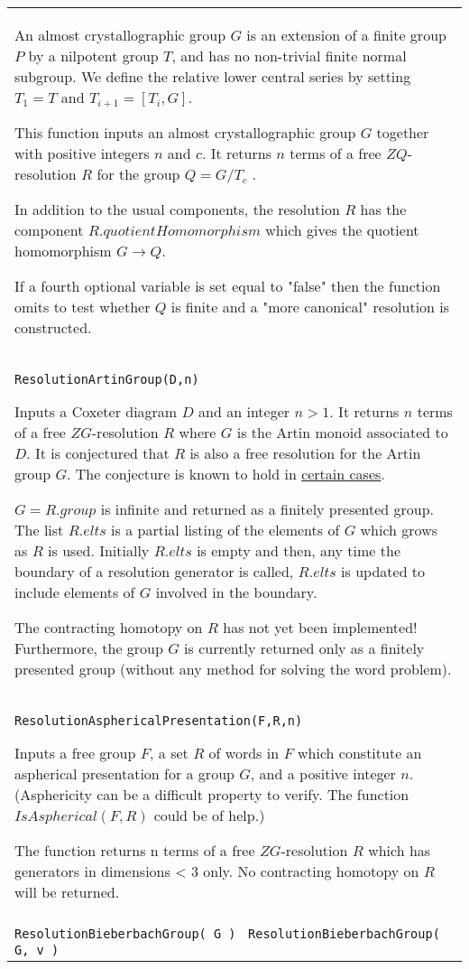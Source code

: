\documentclass[a4paper,11pt]{report}
\begin{document}
{\begin{center}
\begin{tabular}{|l|}
 An almost crystallographic group $G$ is an extension of a finite group $P$ by a nilpotent group $T$, and has no non-trivial finite normal subgroup. We define the relative lower
central series by setting $T_1=T$ and $T_{i+1}=[T_i,G]$.

 This function inputs an almost crystallographic group $G$ together with positive integers $n$ and $c$. It returns $n$ terms of a free $ZQ$-resolution $R$ for the group $Q=G/T_c$ .

 In addition to the usual components, the resolution $R$ has the component $R.quotientHomomorphism$ which gives the quotient homomorphism $G \longrightarrow Q $.

 If a fourth optional variable is set equal to "false" then the function omits
to test whether $Q$ is finite and a "more canonical" resolution is constructed. \\
 \index{ResolutionArtinGroup} \texttt{ResolutionArtinGroup(D,n)} 

 Inputs a Coxeter diagram $D$ and an integer $n>1$. It returns $n$ terms of a free $ZG$-resolution $R$ where $G$ is the Artin monoid associated to $D$. It is conjectured that $R$ is also a free resolution for the Artin group $G$. The conjecture is known to hold in \href{../www/SideLinks/About/aboutArtinGroups.html} {certain cases}.

 $G=R.group$ is infinite and returned as a finitely presented group. The list $R.elts$ is a partial listing of the elements of $G$ which grows as $R$ is used. Initially $R.elts$ is empty and then, any time the boundary of a resolution generator is called, $R.elts$ is updated to include elements of $G$ involved in the boundary.

 The contracting homotopy on $R$ has not yet been implemented! Furthermore, the group $G$ is currently returned only as a finitely presented group (without any method
for solving the word problem). \\
 \index{ResolutionAsphericalPresentation} \texttt{ResolutionAsphericalPresentation(F,R,n)} 

 Inputs a free group $F$, a set $R$ of words in $F$ which constitute an aspherical presentation for a group $G$, and a positive integer $n$. (Asphericity can be a difficult property to verify. The function $IsAspherical(F,R)$ could be of help.)

 The function returns n terms of a free $ZG$-resolution $R$ which has generators in dimensions {\textless} 3 only. No contracting homotopy
on $R$ will be returned. \\
 \index{ResolutionBieberbachGroup (HAPcryst)} \texttt{ResolutionBieberbachGroup( G ) } \texttt{ResolutionBieberbachGroup( G, v ) } 


\end{tabular}
\end{center}}
\end{document}
